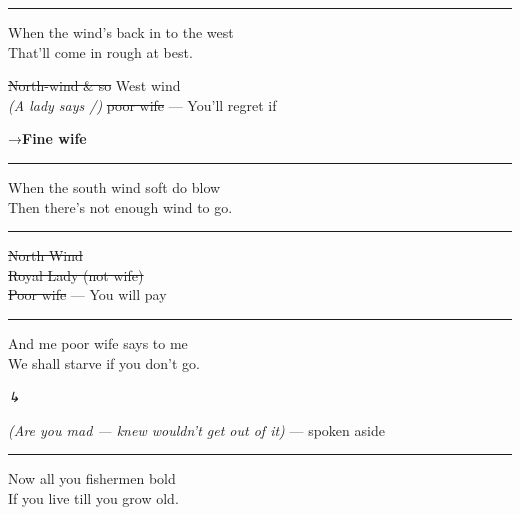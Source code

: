 \documentclass[11pt, a4paper]{article}
\newcommand{\struck}[1]{{\color{strikegray}\sout{#1}}}
\newcommand{\sidecue}[1]{%
  \marginnote{\itshape\small\color{sidegreen}#1}%
}
\newcommand{\stage}[1]{{\itshape\color{stagebrn}\small(#1)}}
\newcommand{\cutline}[1]{%
  {\color{strikegray}\sout{#1}%
  \enspace{\ttfamily\scriptsize[X]}}%
}
\newenvironment{annotation}{%
  \par\noindent\hspace{1em}%
  \begin{minipage}[t]{0.82\linewidth}%
  \ttfamily\footnotesize\color{annotred}\itshape
  {\symbolfont ↳}\enspace\ignorespaces
}{%
  \end{minipage}\par\smallskip%
}
\newenvironment{alt}{%
  \par\vspace{2pt}%
  \noindent\hspace{1.5em}%
  \begin{minipage}[t]{0.82\linewidth}%
  \small\itshape\color{altpurple}%
  \setlength{\leftskip}{6pt}%
}{%
  \end{minipage}\par\vspace{2pt}%
}
\newenvironment{songverse}{%
  \vspace{0.5em}\noindent%
}{%
  \vspace{0.5em}\par%
}
\newcommand{\arrowann}[1]{%
  \par\noindent\hspace{1em}%
  {\color{annotred}\small{\symbolfont →}\enspace #1}\par%
}
\begin{document}
\medskip\hrule\medskip

\begin{songverse}
\begin{bracketgroup}
When the wind's back in to the west\\
That'll come in rough at best. \sidecue{But\ldots}
\begin{alt}
\struck{North-wind \& so} West wind\\
\stage{A lady says /} \struck{poor wife} --- You'll regret if\\
\arrowann{\textbf{Fine wife}}
\end{alt}
\end{bracketgroup}
\end{songverse}

\medskip\hrule\medskip

\begin{songverse}
\begin{bracketgroup}
When the south wind soft do blow\\
Then there's not enough wind to go. \sidecue{Bu[t]\ldots}
\end{bracketgroup}
\end{songverse}

\medskip\hrule\medskip

\begin{songverse}
\begin{bracketgroup}
\cutline{North Wind}\\
\cutline{\struck{Royal Lady (not wife)}}\\
\struck{Poor wife} --- You will pay
\end{bracketgroup}
\end{songverse}

\medskip\hrule\medskip

\begin{songverse}
\begin{bracketgroup}
And me poor wife says to me\\
We shall starve if you don't go. \sidecue{So\ldots}
\end{bracketgroup}
\begin{annotation}
\stage{Are you mad --- knew wouldn't get out of it} --- spoken aside
\end{annotation}
\end{songverse}

\medskip\hrule\medskip

\begin{songverse}
Now all you fishermen bold\\
If you live till you grow old. \sidecue{Do\ldots}
\end{songverse}
\end{document}
